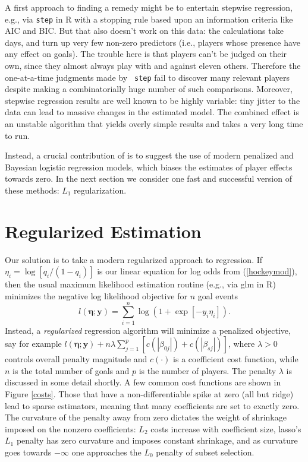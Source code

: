 A first approach to finding a remedy might be to entertain stepwise
regression, e.g., via {\tt step} in {\sf R} with a stopping rule based upon an
information criteria like AIC and BIC.  But that also doesn't work on this
data: the calculations take days, and turn up very few non-zero predictors
(i.e., players whose presence have any effect on goals).  The trouble here is
that players  can't be judged on their own, since they almost always play with
and against eleven others.  Therefore the one-at-a-time judgments made by {\tt
step} fail to discover many relevant players despite making a combinatorially
huge number of such comparisons.  Moreover, stepwise regression results are
well known to be highly variable: tiny jitter to the data can lead to massive
changes in the estimated model. The combined effect is an unstable algorithm
that yields overly simple results and takes a very long time to run.

Instead, a crucial contribution of
\cite{gramacy:jensen:taddy:2013} is to suggest the use of modern penalized and
Bayesian logistic regression models, which biases the estimates of player
effects towards zero. In the next section we consider one fast and successful
version of these methods: $L_1$ regularization.

\section{Regularized Estimation}
\label{sec:regularization}

Our solution is to take a modern regularized approach to regression.  If
$\eta_i = \log[ q_i/(1-q_i) ]$ is our linear equation for log odds from
(\ref{hockeymod}), then the usual maximum likelihood estimation routine (e.g.,
via {\sf glm} in {\sf R}) minimizes the negative log likelihood objective
for $n$ goal events
\begin{equation}
\label{eq:nllhd} l\left(\boldsymbol{\eta}; \mathbf{y}\right) =
\sum_{i=1}^n \log\left(1 + \exp[-y_i \eta_i]\right). 
\end{equation} 
Instead, a
\textit{regularized} regression algorithm will minimize a penalized objective,
say for example $l\left(\boldsymbol{\eta}; \mathbf{y}\right) + n\lambda
\sum_{j=1}^p\left[ c\left(|\beta_{0j}|\right) +
c\left(|\beta_{sj}|\right)\right]$, where $\lambda>0$ controls overall penalty
magnitude and $c(\cdot)$ is a coefficient cost function, while $n$ is the total
number of goals and $p$ is the number of players. The penalty $\lambda$ is
discussed in some detail shortly.  A few common cost functions are shown in
Figure \ref{costs}.  Those that have a non-differentiable spike at zero (all
but ridge) lead to sparse estimators, meaning that many coefficients are set
to exactly zero.   The curvature of the penalty away from zero dictates the
weight of shrinkage imposed on the nonzero coefficients:  $L_2$ costs increase
with coefficient size,  lasso's $L_1$ penalty has zero curvature and imposes
constant shrinkage, and as curvature goes towards $-\infty$ one approaches the
$L_0$ penalty of subset selection.

